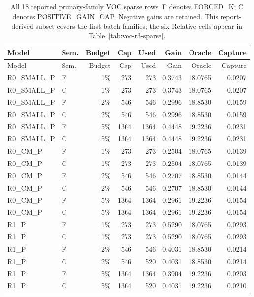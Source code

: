 {\small
\setlength{\tabcolsep}{3pt}
\begin{longtable}{llrrrrrr}
\caption{All 18 reported primary-family VOC sparse rows. F denotes FORCED\_K; C denotes POSITIVE\_GAIN\_CAP. Negative gains are retained. This report-derived subset covers the first-batch families; the six Relative cells appear in Table~\ref{tab:voc-r3-sparse}.}\label{tab:voc-sparse}\\
\toprule
Model & Sem. & Budget & Cap & Used & Gain & Oracle & Capture \\
\midrule
\endfirsthead
\toprule
Model & Sem. & Budget & Cap & Used & Gain & Oracle & Capture \\
\midrule
\endhead
R0\_SMALL\_P & F & 1\% & 273 & 273 & 0.3743 & 18.0765 & 0.0207 \\
R0\_SMALL\_P & C & 1\% & 273 & 273 & 0.3743 & 18.0765 & 0.0207 \\
R0\_SMALL\_P & F & 2\% & 546 & 546 & 0.2996 & 18.8530 & 0.0159 \\
R0\_SMALL\_P & C & 2\% & 546 & 546 & 0.2996 & 18.8530 & 0.0159 \\
R0\_SMALL\_P & F & 5\% & 1364 & 1364 & 0.4448 & 19.2236 & 0.0231 \\
R0\_SMALL\_P & C & 5\% & 1364 & 1364 & 0.4448 & 19.2236 & 0.0231 \\
R0\_CM\_P & F & 1\% & 273 & 273 & 0.2504 & 18.0765 & 0.0139 \\
R0\_CM\_P & C & 1\% & 273 & 273 & 0.2504 & 18.0765 & 0.0139 \\
R0\_CM\_P & F & 2\% & 546 & 546 & 0.2707 & 18.8530 & 0.0144 \\
R0\_CM\_P & C & 2\% & 546 & 546 & 0.2707 & 18.8530 & 0.0144 \\
R0\_CM\_P & F & 5\% & 1364 & 1364 & 0.2961 & 19.2236 & 0.0154 \\
R0\_CM\_P & C & 5\% & 1364 & 1364 & 0.2961 & 19.2236 & 0.0154 \\
R1\_P & F & 1\% & 273 & 273 & 0.5290 & 18.0765 & 0.0293 \\
R1\_P & C & 1\% & 273 & 273 & 0.5290 & 18.0765 & 0.0293 \\
R1\_P & F & 2\% & 546 & 546 & 0.4031 & 18.8530 & 0.0214 \\
R1\_P & C & 2\% & 546 & 520 & 0.4031 & 18.8530 & 0.0214 \\
R1\_P & F & 5\% & 1364 & 1364 & 0.3904 & 19.2236 & 0.0203 \\
R1\_P & C & 5\% & 1364 & 520 & 0.4031 & 19.2236 & 0.0210 \\
\bottomrule
\end{longtable}

}
